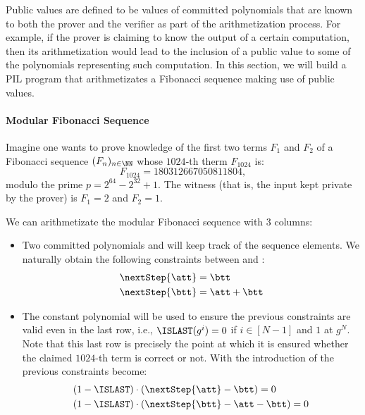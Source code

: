 Public values are defined to be values of committed polynomials that are known to both the prover and the verifier as part of the arithmetization process. For example, if the prover is claiming to know the output of a certain computation, then its arithmetization would lead to the inclusion of a public value to some of the polynomials representing such computation. In this section, we will build a PIL program that arithmetizates a Fibonacci sequence making use of public values.

\paragraph{Modular Fibonacci Sequence} Imagine one wants to prove knowledge of the first two terms $F_1$ and $F_2$ of a Fibonacci sequence $(F_n)_{n\in\NN}$ whose $1024$-th therm $F_{1024}$ is:
\[
F_{1024} = 180312667050811804,
\]
modulo the prime $p = 2^{64} - 2^{32} + 1$. The witness (that is, the input kept private by the prover) is $F_1 = 2$ and $F_2 = 1$. 

We can arithmetizate the modular Fibonacci sequence with $3$ columns:
\begin{itemize}
\item Two committed polynomials \att and \btt will keep track of the sequence elements. We naturally obtain the following constraints between \att and \btt:
\begin{align*}
&\nextStep{\att} = \btt \\
&\nextStep{\btt} = \att + \btt
\end{align*}

\item The constant polynomial \ISLAST will be used to ensure the previous constraints are valid even in the last row, i.e., $\ISLAST(g^i) = 0$ if $i\in[N-1]$ and $1$ at $g^N$. Note that this last row is precisely the point at which it is ensured whether the claimed $ 1024$-th term is correct or not. With the introduction of \ISLAST the previous constraints become:
\begin{align*}
&(1 - \ISLAST) \cdot (\nextStep{\att} - \btt) = 0\\
&(1 - \ISLAST) \cdot (\nextStep{\btt} - \att - \btt) = 0
\end{align*}
\end{itemize}

